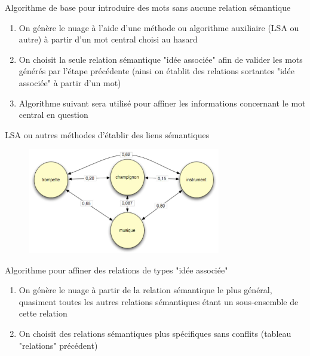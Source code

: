 \documentclass{beamer}
\begin{document}
\begin{frame}
  Algorithme de base pour introduire des mots sans aucune relation sémantique 
  \begin{enumerate}
  \item On génère le nuage à l'aide d'une méthode ou algorithme auxiliaire (LSA ou autre) à partir d'un mot central choisi au hasard
  \item On choisit la seule relation sémantique "idée associée" afin de valider les mots générés par l'étape précédente (ainsi on établit des relations sortantes "idée associée" à partir d'un mot)
  \item Algorithme suivant sera utilisé pour affiner les informations concernant le mot central en question
  \end{enumerate} 
\end{frame}


\begin{frame}
LSA ou autres méthodes d'établir des liens sémantiques
\begin{figure}
 \begin{minipage}{\textwidth}
\centering 
       \includegraphics[width=0.75\textwidth]{img/lsa.jpeg}
  \end{minipage}
\end{figure}
\end{frame}

\begin{frame}
  Algorithme pour affiner des relations de types "idée associée"
  \begin{enumerate}
  \item On génère le nuage à partir de la relation sémantique le plus général, quasiment toutes les autres relations sémantiques étant un sous-ensemble de cette relation
  \item On choisit des relations sémantiques plus spécifiques sans conflits (tableau "relations" précédent)
  \end{enumerate}  
\end{frame}
\end{document}
